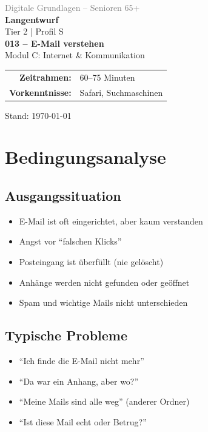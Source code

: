 \documentclass[11pt,a4paper]{article}
\begin{document}
\begin{titlepage}
    \centering
    \vspace*{2cm}
    {\Large\textcolor{gray}{Digitale Grundlagen -- Senioren 65+}}\\[2cm]
    {\Huge\textcolor{fach}{\textbf{Langentwurf}}}\\[0.5cm]
    {\large Tier 2 | Profil S}\\[2cm]
    {\LARGE\textbf{013 -- E-Mail verstehen}}\\[0.5cm]
    {\large Modul C: Internet \& Kommunikation}\\[2cm]
    \begin{tabular}{rl}
        \textbf{Zeitrahmen:} & 60--75 Minuten \\
        \textbf{Vorkenntnisse:} & Safari, Suchmaschinen \\
    \end{tabular}
    \vfill
    {\normalsize Stand: \today}
\end{titlepage}

\tableofcontents
\newpage

\section{Bedingungsanalyse}

\subsection{Ausgangssituation}
\begin{itemize}
    \item E-Mail ist oft eingerichtet, aber kaum verstanden
    \item Angst vor ``falschen Klicks''
    \item Posteingang ist überfüllt (nie gelöscht)
    \item Anhänge werden nicht gefunden oder geöffnet
    \item Spam und wichtige Mails nicht unterschieden
\end{itemize}

\subsection{Typische Probleme}
\begin{itemize}
    \item ``Ich finde die E-Mail nicht mehr''
    \item ``Da war ein Anhang, aber wo?''
    \item ``Meine Mails sind alle weg'' (anderer Ordner)
    \item ``Ist diese Mail echt oder Betrug?''
\end{itemize}
\end{document}
